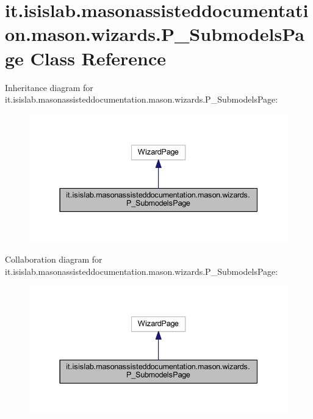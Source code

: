 \hypertarget{classit_1_1isislab_1_1masonassisteddocumentation_1_1mason_1_1wizards_1_1_p___submodels_page}{\section{it.\-isislab.\-masonassisteddocumentation.\-mason.\-wizards.\-P\-\_\-\-Submodels\-Page Class Reference}
\label{classit_1_1isislab_1_1masonassisteddocumentation_1_1mason_1_1wizards_1_1_p___submodels_page}
}


Inheritance diagram for it.\-isislab.\-masonassisteddocumentation.\-mason.\-wizards.\-P\-\_\-\-Submodels\-Page\-:\nopagebreak
\begin{figure}[H]
\begin{center}
\leavevmode
\includegraphics[width=337pt]{classit_1_1isislab_1_1masonassisteddocumentation_1_1mason_1_1wizards_1_1_p___submodels_page__inherit__graph}
\end{center}
\end{figure}


Collaboration diagram for it.\-isislab.\-masonassisteddocumentation.\-mason.\-wizards.\-P\-\_\-\-Submodels\-Page\-:\nopagebreak
\begin{figure}[H]
\begin{center}
\leavevmode
\includegraphics[width=337pt]{classit_1_1isislab_1_1masonassisteddocumentation_1_1mason_1_1wizards_1_1_p___submodels_page__coll__graph}
\end{center}
\end{figure}
